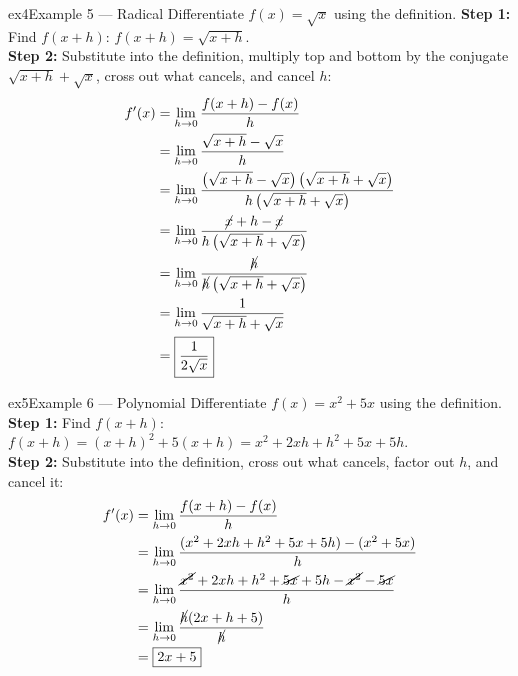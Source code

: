 \documentclass[11pt]{article}
\begin{document}
\begin{example}{ex4}{Example 5 --- Radical}
Differentiate $f(x)=\sqrt{x}$ using the definition.\soln
\textbf{Step 1:} Find $f(x+h)$: $f(x+h)=\sqrt{x+h}$.\\[3pt]
\textbf{Step 2:} Substitute into the definition, multiply top and bottom by the conjugate $\sqrt{x+h}+\sqrt{x}$, cross out what cancels, and cancel $h$:
\begin{align*}
f'(x)&=\lim_{h\to0}\frac{f(x+h)-f(x)}{h}\\
&=\lim_{h\to0}\frac{\sqrt{x+h}-\sqrt{x}}{h}\\
&=\lim_{h\to0}\frac{\left(\sqrt{x+h}-\sqrt{x}\right)\left(\sqrt{x+h}+\sqrt{x}\right)}{h\left(\sqrt{x+h}+\sqrt{x}\right)}\\
&=\lim_{h\to0}\frac{\cancel{x}+h-\cancel{x}}{h\left(\sqrt{x+h}+\sqrt{x}\right)}\\
&=\lim_{h\to0}\frac{\cancel{h}}{\cancel{h}\left(\sqrt{x+h}+\sqrt{x}\right)}\\
&=\lim_{h\to0}\frac{1}{\sqrt{x+h}+\sqrt{x}}\\
&=\boxed{\frac{1}{2\sqrt{x}}}
\end{align*}
\end{example}

\begin{example}{ex5}{Example 6 --- Polynomial}
Differentiate $f(x)=x^2+5x$ using the definition.\soln
\textbf{Step 1:} Find $f(x+h)$: $f(x+h)=(x+h)^2+5(x+h)=x^2+2xh+h^2+5x+5h$.\\[3pt]
\textbf{Step 2:} Substitute into the definition, cross out what cancels, factor out $h$, and cancel it:
\begin{align*}
f'(x)&=\lim_{h\to0}\frac{f(x+h)-f(x)}{h}\\
&=\lim_{h\to0}\frac{(x^2+2xh+h^2+5x+5h)-(x^2+5x)}{h}\\
&=\lim_{h\to0}\frac{\cancel{x^2}+2xh+h^2+\cancel{5x}+5h-\cancel{x^2}-\cancel{5x}}{h}\\
&=\lim_{h\to0}\frac{\cancel{h}(2x+h+5)}{\cancel{h}}\\
&=\boxed{2x+5}
\end{align*}
\end{example}
\end{document}
